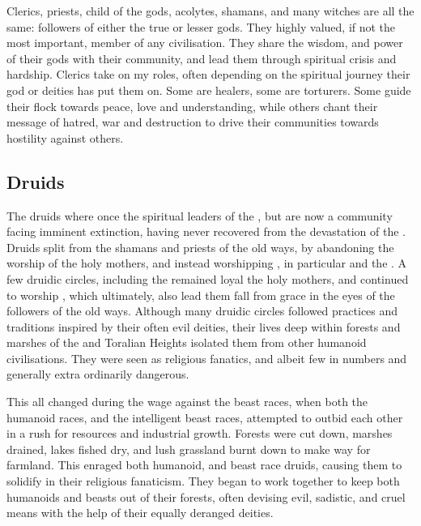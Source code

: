 Clerics, priests, child of the gods, acolytes, shamans, and many witches are
all the same: followers of either the true or lesser gods. They highly valued,
if not the most important, member of any civilisation. They share the wisdom,
and power of their gods with their community, and lead them through spiritual
crisis and hardship. Clerics take on my roles, often depending on the
spiritual journey their god or deities has put them on. Some are healers, some
are torturers. Some guide their flock towards peace, love and understanding,
while others chant their message of hatred, war and destruction to drive their
communities towards hostility against others.

\subsection{Druids}
\label{sec:Druids}

The druids where once the spiritual leaders of the , but
are now a community facing imminent extinction, having never recovered from
the devastation of the . Druids split from the
shamans and priests of the old ways, by abandoning the worship of the holy
mothers, and instead worshipping , in particular
 and the . A few druidic circles,
including the  remained loyal the holy mothers,
and continued to worship , which ultimately, also lead
them fall from grace in the eyes of the followers of the old ways. Although
many druidic circles followed practices and traditions inspired by their often
evil deities, their lives deep within forests and marshes of the
 and Toralian Heights isolated them from other humanoid
civilisations. They were seen as religious fanatics, and albeit few in numbers
and generally extra ordinarily dangerous.

This all changed during the wage against the beast races, when both the
humanoid races, and the intelligent beast races, attempted to outbid each
other in a rush for resources and industrial growth. Forests were cut down,
marshes drained, lakes fished dry, and lush grassland burnt down to make way
for farmland. This enraged both humanoid, and beast race druids, causing them
to solidify in their religious fanaticism. They began to work together to keep
both humanoids and beasts out of their forests, often devising evil, sadistic,
and cruel means with the help of their equally deranged deities.

